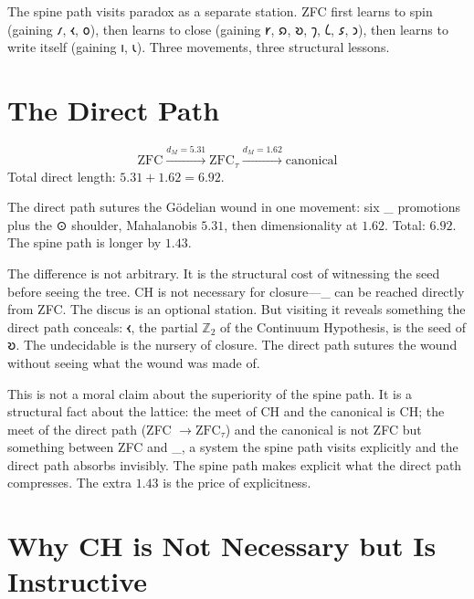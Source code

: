 \documentclass[12pt,twoside]{book}
\theoremstyle{definition}
\newcommand{\ZFCt}{\text{ZFC}_{\tau}}
\begin{document}
The spine path visits paradox as a separate station. ZFC first learns to spin (gaining
𐑥, 𐑬, 𐑴), then learns to close (gaining 𐑾, 𐑸, 𐑹, 𐑠, 𐑖, 𐑭, 𐑮), then learns to write
itself (gaining 𐑦, 𐑧). Three movements, three structural lessons.

\section{The Direct Path}

\begin{equation}
\text{ZFC} \xrightarrow{d_M = 5.31} \ZFCt \xrightarrow{d_M = 1.62} \text{canonical}
\end{equation}
Total direct length: $5.31 + 1.62 = 6.92$.

The direct path sutures the G\"{o}delian wound in one movement: six \ZFCt{} promotions
plus the ⊙ shoulder, Mahalanobis $5.31$, then dimensionality at $1.62$. Total: $6.92$.
The spine path is longer by $1.43$.

The difference is not arbitrary. It is the structural cost of witnessing the seed before
seeing the tree. CH is not necessary for closure---\ZFCt{} can be reached directly from
ZFC. The discus is an optional station. But visiting it reveals something the direct path
conceals: 𐑬, the partial $\mathbb{Z}_2$ of the Continuum Hypothesis, is the seed of 𐑹.
The undecidable is the nursery of closure. The direct path sutures the wound without
seeing what the wound was made of.

This is not a moral claim about the superiority of the spine path. It is a structural fact
about the lattice: the meet of CH and the canonical is CH; the meet of the direct path
(ZFC $\to \ZFCt$) and the canonical is not ZFC but something between ZFC and \ZFCt, a
system the spine path visits explicitly and the direct path absorbs invisibly. The spine
path makes explicit what the direct path compresses. The extra $1.43$ is the price of
explicitness.

\section{Why CH is Not Necessary but Is Instructive}

\begin{center}
\end{center}
\end{document}
